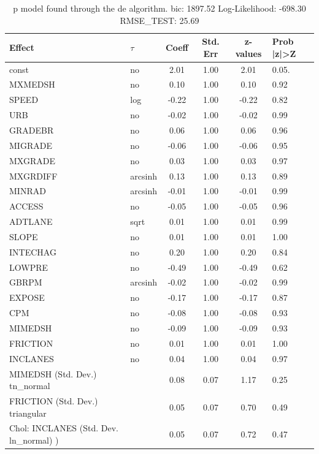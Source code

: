 \begin{table}
	\caption{p model found through the de algorithm. bic: 1897.52 Log-Likelihood: -698.30 RMSE_TEST: 25.69}
	\begin{center}
		\begin{tabular}{|l|l|c|c|c|l|}
			\hline
			Effect & $\tau$ & Coeff & Std. Err & z-values & Prob |z|>Z \\
			\hline
			const & no & 2.01 & 1.00 & 2.01 & 0.05. \\
			\hline
			MXMEDSH & no & 0.10 & 1.00 & 0.10 & 0.92 \\
			\hline
			SPEED & log & -0.22 & 1.00 & -0.22 & 0.82 \\
			\hline
			URB & no & -0.02 & 1.00 & -0.02 & 0.99 \\
			\hline
			GRADEBR & no & 0.06 & 1.00 & 0.06 & 0.96 \\
			\hline
			MIGRADE & no & -0.06 & 1.00 & -0.06 & 0.95 \\
			\hline
			MXGRADE & no & 0.03 & 1.00 & 0.03 & 0.97 \\
			\hline
			MXGRDIFF & arcsinh & 0.13 & 1.00 & 0.13 & 0.89 \\
			\hline
			MINRAD & arcsinh & -0.01 & 1.00 & -0.01 & 0.99 \\
			\hline
			ACCESS & no & -0.05 & 1.00 & -0.05 & 0.96 \\
			\hline
			ADTLANE & sqrt & 0.01 & 1.00 & 0.01 & 0.99 \\
			\hline
			SLOPE & no & 0.01 & 1.00 & 0.01 & 1.00 \\
			\hline
			INTECHAG & no & 0.20 & 1.00 & 0.20 & 0.84 \\
			\hline
			LOWPRE & no & -0.49 & 1.00 & -0.49 & 0.62 \\
			\hline
			GBRPM & arcsinh & -0.02 & 1.00 & -0.02 & 0.99 \\
			\hline
			EXPOSE & no & -0.17 & 1.00 & -0.17 & 0.87 \\
			\hline
			CPM & no & -0.08 & 1.00 & -0.08 & 0.93 \\
			\hline
			MIMEDSH & no & -0.09 & 1.00 & -0.09 & 0.93 \\
			\hline
			FRICTION & no & 0.01 & 1.00 & 0.01 & 1.00 \\
			\hline
			INCLANES & no & 0.04 & 1.00 & 0.04 & 0.97 \\
			\hline
			MIMEDSH (Std. Dev.) tn_normal &  & 0.08 & 0.07 & 1.17 & 0.25 \\
			\hline
			FRICTION (Std. Dev.) triangular &  & 0.05 & 0.07 & 0.70 & 0.49 \\
			\hline
			 Chol: INCLANES (Std. Dev. ln_normal) ) &  & 0.05 & 0.07 & 0.72 & 0.47 \\
			\hline
		\end{tabular}
	\end{center}
\end{table}
